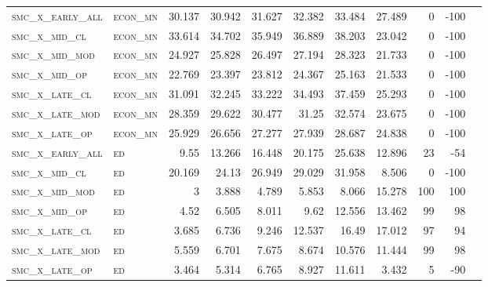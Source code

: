 \begin{landscape}
\begin{center}
\begin{footnotesize}
\begin{longtable}{llrrrrrr|rrr}
\textsc{smc\_x\_early\_all} & \textsc{econ\_mn  }   & 30.137     & 30.942     & 31.627     & 32.382     & 33.484     & 27.489     & 0     & -100   \\
\textsc{smc\_x\_mid\_cl   } & \textsc{econ\_mn  }   & 33.614     & 34.702     & 35.949     & 36.889     & 38.203     & 23.042     & 0     & -100   \\
\textsc{smc\_x\_mid\_mod  } & \textsc{econ\_mn  }   & 24.927     & 25.828     & 26.497     & 27.194     & 28.323     & 21.733     & 0     & -100   \\
\textsc{smc\_x\_mid\_op   } & \textsc{econ\_mn  }   & 22.769     & 23.397     & 23.812     & 24.367     & 25.163     & 21.533     & 0     & -100   \\
\textsc{smc\_x\_late\_cl  } & \textsc{econ\_mn  }   & 31.091     & 32.245     & 33.222     & 34.493     & 37.459     & 25.293     & 0     & -100   \\
\textsc{smc\_x\_late\_mod } & \textsc{econ\_mn  }   & 28.359     & 29.622     & 30.477     & 31.25      & 32.574     & 23.675     & 0     & -100   \\
\textsc{smc\_x\_late\_op  } & \textsc{econ\_mn  }   & 25.929     & 26.656     & 27.277     & 27.939     & 28.687     & 24.838     & 0     & -100   \\
\textsc{smc\_x\_early\_all} & \textsc{ed        }   & 9.55       & 13.266     & 16.448     & 20.175     & 25.638     & 12.896     & 23    & -54    \\
\textsc{smc\_x\_mid\_cl   } & \textsc{ed        }   & 20.169     & 24.13      & 26.949     & 29.029     & 31.958     & 8.506      & 0     & -100   \\
\textsc{smc\_x\_mid\_mod  } & \textsc{ed        }   & 3          & 3.888      & 4.789      & 5.853      & 8.066      & 15.278     & 100   & 100    \\
\textsc{smc\_x\_mid\_op   } & \textsc{ed        }   & 4.52       & 6.505      & 8.011      & 9.62       & 12.556     & 13.462     & 99    & 98     \\
\textsc{smc\_x\_late\_cl  } & \textsc{ed        }   & 3.685      & 6.736      & 9.246      & 12.537     & 16.49      & 17.012     & 97    & 94     \\
\textsc{smc\_x\_late\_mod } & \textsc{ed        }   & 5.559      & 6.701      & 7.675      & 8.674      & 10.576     & 11.444     & 99    & 98     \\
\textsc{smc\_x\_late\_op  } & \textsc{ed        }   & 3.464      & 5.314      & 6.765      & 8.927      & 11.611     & 3.432      & 5     & -90    \\

\end{longtable}
\end{footnotesize}
\end{center}
\end{landscape}

